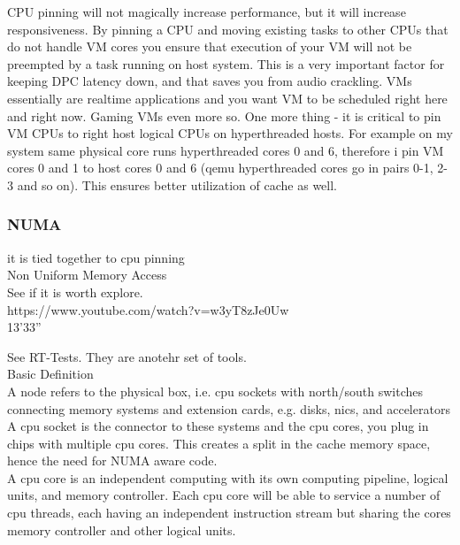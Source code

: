\documentclass[11pt, a4paper, oneside]{article}
\theoremstyle{definition}
\begin{document}
CPU pinning will not magically increase performance, but it will increase responsiveness. By pinning a CPU and moving existing tasks to other CPUs that do not handle VM cores you ensure that execution of your VM will not be preempted by a task running on host system. This is a very important factor for keeping DPC latency down, and that saves you from audio crackling. VMs essentially are realtime applications and you want VM to be scheduled right here and right now. Gaming VMs even more so. One more thing - it is critical to pin VM CPUs to right host logical CPUs on hyperthreaded hosts. For example on my system same physical core runs hyperthreaded cores 0 and 6, therefore i pin VM cores 0 and 1 to host cores 0 and 6 (qemu hyperthreaded cores go in pairs 0-1, 2-3 and so on). This ensures better utilization of cache as well.
\\

\subsubsection{NUMA}
it is tied together to cpu pinning\\
Non Uniform Memory Access\\
See if it is worth explore.\\

https://www.youtube.com/watch?v=w3yT8zJe0Uw\\
13'33''

See RT-Tests. They are anotehr set of tools.\\

Basic Definition\\

A node refers to the physical box, i.e. cpu sockets with north/south switches connecting memory systems and extension cards, e.g. disks, nics, and accelerators\\

A cpu socket is the connector to these systems and the cpu cores, you plug in chips with multiple cpu cores. This creates a split in the cache memory space, hence the need for NUMA aware code.\\

A cpu core is an independent computing with its own computing pipeline, logical units, and memory controller. Each cpu core will be able to service a number of cpu threads, each having an independent instruction stream but sharing the cores memory controller and other logical units.\\
\end{document}

